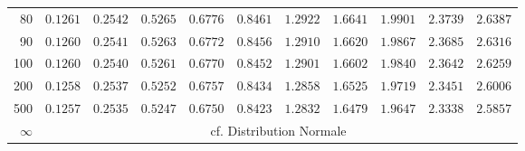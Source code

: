 \begin{center}
\begin{tabular}{r|rrrrrrrrrr}
80&$0.1261$&$0.2542$&$0.5265$&$0.6776$&$0.8461$&$1.2922$&$1.6641$&$ 1.9901$&$ 2.3739$&$ 2.6387$\\
90&$0.1260$&$0.2541$&$0.5263$&$0.6772$&$0.8456$&$1.2910$&$1.6620$&$ 1.9867$&$ 2.3685$&$ 2.6316$\\
100&$0.1260$&$0.2540$&$0.5261$&$0.6770$&$0.8452$&$1.2901$&$1.6602$&$ 1.9840$&$ 2.3642$&$ 2.6259$\\
200&$0.1258$&$0.2537$&$0.5252$&$0.6757$&$0.8434$&$1.2858$&$1.6525$&$ 1.9719$&$ 2.3451$&$ 2.6006$\\
500&$0.1257$&$0.2535$&$0.5247$&$0.6750$&$0.8423$&$1.2832$&$1.6479$&$ 1.9647$&$ 2.3338$&$ 2.5857$\\
$\infty$ & \multicolumn{10}{c}{cf. Distribution Normale}
\end{tabular}

\end{center}

